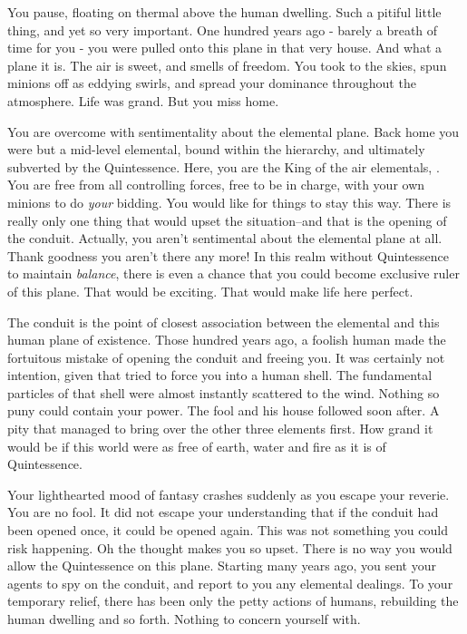 \documentclass[char]{elementals}
\begin{document}
\name{\cKing{}}


You pause, floating on thermal above the human dwelling. Such a pitiful little thing, and yet so very important. One hundred years ago - barely a breath of time for you - you were pulled onto this plane in that very house. And what a plane it is. The air is sweet, and smells of freedom. You took to the skies, spun minions off as eddying swirls, and spread your dominance throughout the atmosphere.  Life was grand. But you miss home.

You are overcome with sentimentality about the elemental plane. Back home you were but a mid-level elemental, bound within the hierarchy, and ultimately subverted by the Quintessence. Here, you are the King of the air elementals, \cKing{\intro}. You are free from all controlling forces, free to be in charge, with your own minions to do \emph{your} bidding. You would like for things to stay this way. There is really only one thing that would upset the situation--and that is the opening of the conduit. Actually, you aren't sentimental about the elemental plane at all. Thank goodness you aren't there any more! In this realm without Quintessence to maintain \emph{balance}, there is even a chance that you could become exclusive ruler of this plane. That would be exciting. That would make life here perfect.

The conduit is the point of closest association between the elemental and this human plane of existence. Those hundred years ago, a foolish human made the fortuitous mistake of opening the conduit and freeing you. It was certainly not \cGrandfather{\their} intention, given that \cGrandfather{\they} tried to force you into a human shell. The fundamental particles of that shell were almost instantly scattered to the wind. Nothing so puny could contain your power. The fool and his house followed soon after. A pity that \cGrandfather{} managed to bring over the other three elements first. How grand it would be if this world were as free of earth, water and fire as it is of Quintessence.

Your lighthearted mood of fantasy crashes suddenly as you escape your reverie. You are no fool. It did not escape your understanding that if the conduit had been opened once, it could be opened again. This was not something you could risk happening. Oh the thought makes you so upset. There is no way you would allow the Quintessence on this plane. Starting many years ago, you sent your agents to spy on the conduit, and report to you any elemental dealings. To your temporary relief, there has been only the petty actions of humans, rebuilding the human dwelling and so forth. Nothing to concern yourself with.
\end{document}
